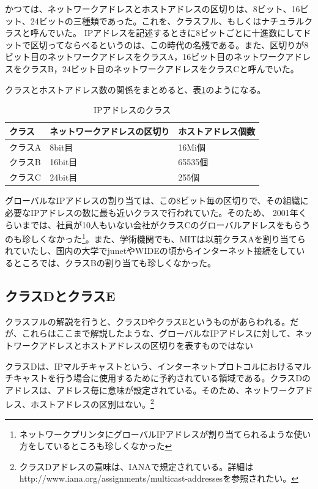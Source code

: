 かつては、ネットワークアドレスとホストアドレスの区切りは、8ビット、16ビット、24ビットの三種類であった。これを、クラスフル、もしくはナチュラルクラスと呼んでいた。 IPアドレスを記述するときに8ビットごとに十進数にしてドットで区切ってならべるというのは、この時代の名残である。また、区切りが8ビット目のネットワークアドレスをクラスA，16ビット目のネットワークアドレスをクラスB，24ビット目のネットワークアドレスをクラスCと呼んでいた。

クラスとホストアドレス数の関係をまとめると、表\ref{ipclass}のようになる。

\begin{table}[hbtp] \caption{IPアドレスのクラス} \label{ipclass}
\begin{center}
\begin{tabularx}{110mm}{XXX} \toprule
クラス & ネットワークアドレスの区切り & ホストアドレス個数\\ \midrule
クラスA & 8bit目 & 16Mi個\\
クラスB & 16bit目 & 65535個\\
クラスC & 24bit目 & 255個\\ \bottomrule
\end{tabularx}
\end{center}
\end{table}

グローバルなIPアドレスの割り当ては、この8ビット毎の区切りで、その組織に必要なIPアドレスの数に最も近いクラスで行われていた。そのため、 2001年くらいまでは、社員が10人もいない会社がクラスCのグローバルアドレスをもらうのも珍しくなかった\footnote{ネットワークプリンタにグローバルIPアドレスが割り当てられるような使い方をしているところも珍しくなかった}。また、学術機関でも、MITは以前クラスAを割り当てられていたし、国内の大学でjunetやWIDEの頃からインターネット接続をしているところでは、クラスBの割り当ても珍しくなかった。

\subsection{クラスDとクラスE}
クラスフルの解説を行うと、クラスDやクラスEというものがあらわれる。だが、これらはここまで解説したような、グローバルなIPアドレスに対して、ネットワークアドレスとホストアドレスの区切りを表すものではない

クラスDは、IPマルチキャストという、インターネットプロトコルにおけるマルチキャストを行う場合に使用するために予約されている領域である。クラスDのアドレスは、アドレス毎に意味が設定されている。そのため、ネットワークアドレス、ホストアドレスの区別はない。\footnote{クラスDアドレスの意味は、IANAで規定されている。詳細はhttp://www.iana.org/assignments/multicast-addressesを参照されたい。}

